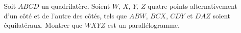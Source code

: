 Soit $ABCD$ un quadrilatère. Soient $W$, $X$, $Y$, $Z$ quatre points alternativement d'un côté et de l'autre des côtés, tels que $ABW$, $BCX$, $CDY$ et $DAZ$ soient équilatéraux. Montrer que $WXYZ$ est un parallélogramme.
